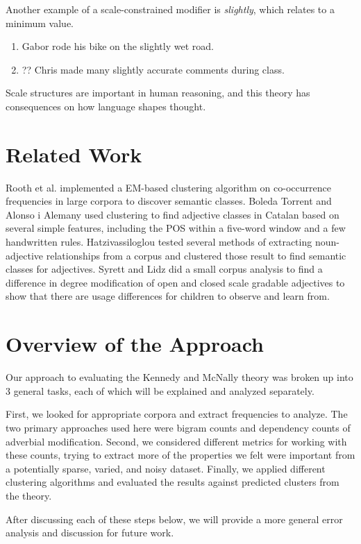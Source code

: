 \documentclass[11pt]{amsart}
\begin{document}
Another example of a scale-constrained modifier is \textit{slightly}, which relates to a minimum value.

\begin{enumerate}
\item Gabor rode his bike on the slightly wet road.
\item ?? Chris made many slightly accurate comments during class.
\end{enumerate}

Scale structures are important in human reasoning, and this theory has consequences on how language shapes thought.

\section{Related Work}
Rooth et al.\cite{rooth} implemented a EM-based clustering algorithm on co-occurrence frequencies in large corpora to discover semantic classes. Boleda Torrent and Alonso i Alemany\cite{boleda} used clustering to find adjective classes in Catalan based on several simple features, including the POS within a five-word window and a few handwritten rules. Hatzivassiloglou\cite{hat} tested several methods of extracting noun-adjective relationships from a corpus and clustered those result to find semantic classes for adjectives. Syrett and Lidz\cite{syrett} did a small corpus analysis to find a difference in degree modification of open and closed scale gradable adjectives to show that there are usage differences for children to observe and learn from.

\section{Overview of the Approach}
Our approach to evaluating the Kennedy and McNally theory was broken up into 3 general tasks, each of which will be explained and analyzed separately. 

First, we looked for appropriate corpora and extract frequencies to analyze. The two primary approaches used here were bigram counts and dependency counts of adverbial modification. Second, we considered different metrics for working with these counts, trying to extract more of the properties we felt were important from a potentially sparse, varied, and noisy dataset. Finally, we applied different clustering algorithms and evaluated the results against predicted clusters from the theory.

After discussing each of these steps below, we will provide a more general error analysis and discussion for future work.
\end{document}
